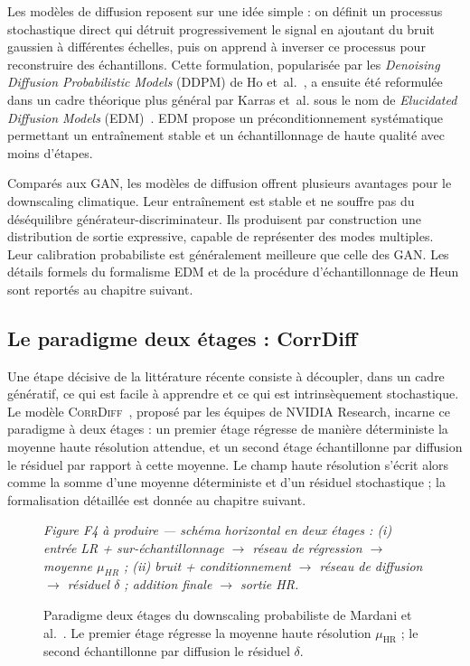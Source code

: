 \documentclass[14pt,a4paper,openany]{extreport}
\theoremstyle{definition}
\newcommand{\CorrDiff}{\textsc{CorrDiff}}
\newcommand{\HR}{\ensuremath{\text{HR}}}
\newcommand{\muHR}{\ensuremath{\mu_{\HR}}}
\newcommand{\figplaceholder}[2][0.9\linewidth]{%
  \begin{tcolorbox}[width=#1,height=5cm,valign=center,colback=gray!8,colframe=gray!45,arc=2pt,boxrule=0.5pt]
    \centering\small\textit{#2}
  \end{tcolorbox}%
}
\begin{document}
Les modèles de diffusion reposent sur une idée simple : on définit un processus stochastique direct qui détruit progressivement le signal en ajoutant du bruit gaussien à différentes échelles, puis on apprend à inverser ce processus pour reconstruire des échantillons. Cette formulation, popularisée par les \emph{Denoising Diffusion Probabilistic Models} (DDPM) de Ho et~al.~\cite{ho_ddpm_2020}, a ensuite été reformulée dans un cadre théorique plus général par Karras et~al. sous le nom de \emph{Elucidated Diffusion Models} (EDM)~\cite{karras_edm_2022}. EDM propose un préconditionnement systématique permettant un entraînement stable et un échantillonnage de haute qualité avec moins d'étapes.

Comparés aux GAN, les modèles de diffusion offrent plusieurs avantages pour le downscaling climatique. Leur entraînement est stable et ne souffre pas du déséquilibre générateur-discriminateur. Ils produisent par construction une distribution de sortie expressive, capable de représenter des modes multiples. Leur calibration probabiliste est généralement meilleure que celle des GAN. Les détails formels du formalisme EDM et de la procédure d'échantillonnage de Heun sont reportés au chapitre suivant.

\subsection{Le paradigme deux étages : CorrDiff}
\label{ssec:corrdiff}

Une étape décisive de la littérature récente consiste à découpler, dans un cadre génératif, ce qui est facile à apprendre et ce qui est intrinsèquement stochastique. Le modèle \CorrDiff{}~\cite{mardani_corrdiff_2023}, proposé par les équipes de NVIDIA Research, incarne ce paradigme à deux étages : un premier étage régresse de manière déterministe la moyenne haute résolution attendue, et un second étage échantillonne par diffusion le résiduel par rapport à cette moyenne. Le champ haute résolution s'écrit alors comme la somme d'une moyenne déterministe et d'un résiduel stochastique ; la formalisation détaillée est donnée au chapitre suivant.

\begin{figure}[ht]
  \centering
  \figplaceholder{Figure F4 à produire --- schéma horizontal en deux étages : (i) entrée LR + sur-échantillonnage $\to$ réseau de régression $\to$ moyenne $\mu_{HR}$ ; (ii) bruit + conditionnement $\to$ réseau de diffusion $\to$ résiduel $\delta$ ; addition finale $\to$ sortie HR.}
  \caption{Paradigme deux étages du downscaling probabiliste de Mardani et al.~\cite{mardani_corrdiff_2023}. Le premier étage régresse la moyenne haute résolution $\muHR$ ; le second échantillonne par diffusion le résiduel $\delta$.}
  \label{fig:corrdiff}
\end{figure}
\end{document}
